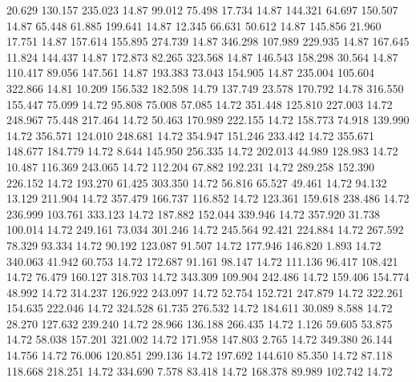   20.629  130.157  235.023        14.87
  99.012   75.498   17.734        14.87
 144.321   64.697  150.507        14.87
  65.448   61.885  199.641        14.87
  12.345   66.631   50.612        14.87
 145.856   21.960   17.751        14.87
 157.614  155.895  274.739        14.87
 346.298  107.989  229.935        14.87
 167.645   11.824  144.437        14.87
 172.873   82.265  323.568        14.87
 146.543  158.298   30.564        14.87
 110.417   89.056  147.561        14.87
 193.383   73.043  154.905        14.87
 235.004  105.604  322.866        14.81
  10.209  156.532  182.598        14.79
 137.749   23.578  170.792        14.78
 316.550  155.447   75.099        14.72
  95.808   75.008   57.085        14.72
 351.448  125.810  227.003        14.72
 248.967   75.448  217.464        14.72
  50.463  170.989  222.155        14.72
 158.773   74.918  139.990        14.72
 356.571  124.010  248.681        14.72
 354.947  151.246  233.442        14.72
 355.671  148.677  184.779        14.72
   8.644  145.950  256.335        14.72
 202.013   44.989  128.983        14.72
  10.487  116.369  243.065        14.72
 112.204   67.882  192.231        14.72
 289.258  152.390  226.152        14.72
 193.270   61.425  303.350        14.72
  56.816   65.527   49.461        14.72
  94.132   13.129  211.904        14.72
 357.479  166.737  116.852        14.72
 123.361  159.618  238.486        14.72
 236.999  103.761  333.123        14.72
 187.882  152.044  339.946        14.72
 357.920   31.738  100.014        14.72
 249.161   73.034  301.246        14.72
 245.564   92.421  224.884        14.72
 267.592   78.329   93.334        14.72
  90.192  123.087   91.507        14.72
 177.946  146.820    1.893        14.72
 340.063   41.942   60.753        14.72
 172.687   91.161   98.147        14.72
 111.136   96.417  108.421        14.72
  76.479  160.127  318.703        14.72
 343.309  109.904  242.486        14.72
 159.406  154.774   48.992        14.72
 314.237  126.922  243.097        14.72
  52.754  152.721  247.879        14.72
 322.261  154.635  222.046        14.72
 324.528   61.735  276.532        14.72
 184.611   30.089    8.588        14.72
  28.270  127.632  239.240        14.72
  28.966  136.188  266.435        14.72
   1.126   59.605   53.875        14.72
  58.038  157.201  321.002        14.72
 171.958  147.803    2.765        14.72
 349.380   26.144   14.756        14.72
  76.006  120.851  299.136        14.72
 197.692  144.610   85.350        14.72
  87.118  118.668  218.251        14.72
 334.690    7.578   83.418        14.72
 168.378   89.989  102.742        14.72
